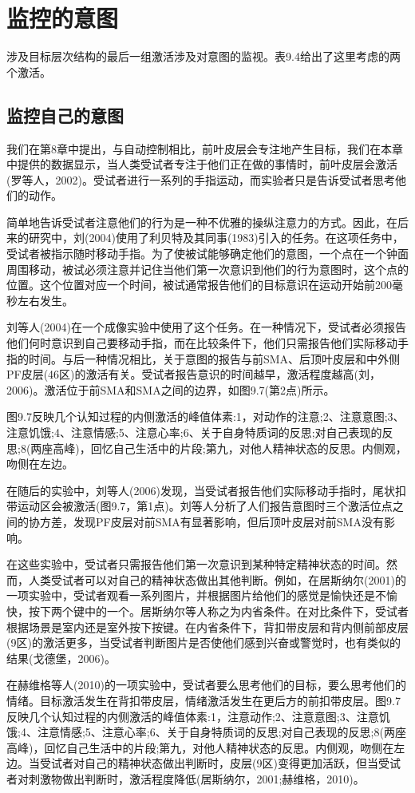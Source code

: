 \section{监控的意图}
\par
涉及目标层次结构的最后一组激活涉及对意图的监视。表9.4给出了这里考虑的两个激活。
\par
\subsection{监控自己的意图}
\par
我们在第8章中提出，与自动控制相比，前叶皮层会专注地产生目标，我们在本章中提供的数据显示，当人类受试者专注于他们正在做的事情时，前叶皮层会激活(罗等人，2002)。受试者进行一系列的手指运动，而实验者只是告诉受试者思考他们的动作。
\par
简单地告诉受试者注意他们的行为是一种不优雅的操纵注意力的方式。因此，在后来的研究中，刘(2004)使用了利贝特及其同事(1983)引入的任务。在这项任务中，受试者被指示随时移动手指。为了使被试能够确定他们的意图，一个点在一个钟面周围移动，被试必须注意并记住当他们第一次意识到他们的行为意图时，这个点的位置。这个位置对应一个时间，被试通常报告他们的目标意识在运动开始前200毫秒左右发生。
\par
刘等人(2004)在一个成像实验中使用了这个任务。在一种情况下，受试者必须报告他们何时意识到自己要移动手指，而在比较条件下，他们只需报告他们实际移动手指的时间。与后一种情况相比，关于意图的报告与前SMA、后顶叶皮层和中外侧PF皮层(46区)的激活有关。受试者报告意识的时间越早，激活程度越高(刘，2006)。激活位于前SMA和SMA之间的边界，如图9.7(第2点)所示。
\par
图9.7反映几个认知过程的内侧激活的峰值体素:1，对动作的注意;2、注意意图;3、注意饥饿;4、注意情感;5、注意心率;6、关于自身特质词的反思;对自己表现的反思;8(两座高峰)，回忆自己生活中的片段;第九，对他人精神状态的反思。内侧观，吻侧在左边。
\par
在随后的实验中，刘等人(2006)发现，当受试者报告他们实际移动手指时，尾状扣带运动区会被激活(图9.7，第1点)。刘等人分析了人们报告意图时三个激活位点之间的协方差，发现PF皮层对前SMA有显著影响，但后顶叶皮层对前SMA没有影响。
\par
在这些实验中，受试者只需报告他们第一次意识到某种特定精神状态的时间。然而，人类受试者可以对自己的精神状态做出其他判断。例如，在居斯纳尔(2001)的一项实验中，受试者观看一系列图片，并根据图片给他们的感觉是愉快还是不愉快，按下两个键中的一个。居斯纳尔等人称之为内省条件。在对比条件下，受试者根据场景是室内还是室外按下按键。在内省条件下，背扣带皮层和背内侧前部皮层(9区)的激活更多，当受试者判断图片是否使他们感到兴奋或警觉时，也有类似的结果(戈德堡，2006)。
\par
在赫维格等人(2010)的一项实验中，受试者要么思考他们的目标，要么思考他们的情绪。目标激活发生在背扣带皮层，情绪激活发生在更后方的前扣带皮层。图9.7反映几个认知过程的内侧激活的峰值体素:1，注意动作;2、注意意图;3、注意饥饿;4、注意情感;5、注意心率;6、关于自身特质词的反思;对自己表现的反思;8(两座高峰)，回忆自己生活中的片段;第九，对他人精神状态的反思。内侧观，吻侧在左边。当受试者对自己的精神状态做出判断时，皮层(9区)变得更加活跃，但当受试者对刺激物做出判断时，激活程度降低(居斯纳尔，2001;赫维格，2010)。
